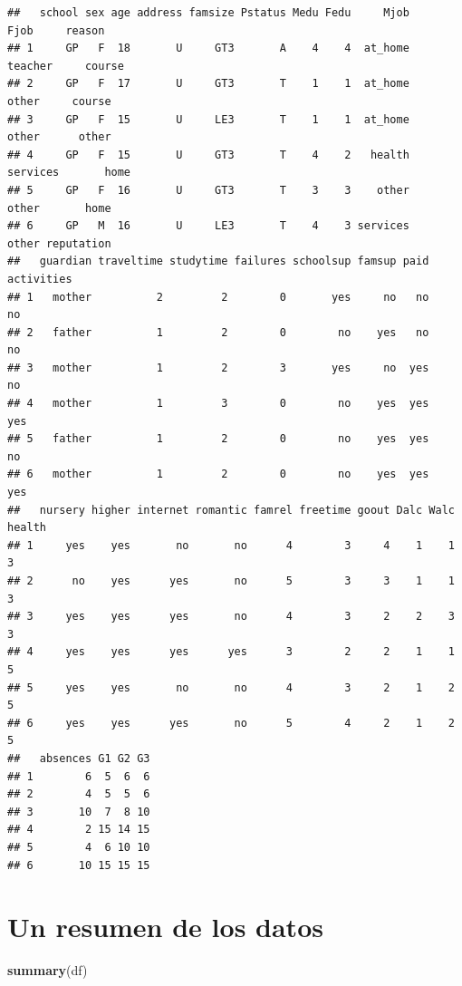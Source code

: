 \documentclass[
]{article}
\newenvironment{Shaded}{\begin{snugshade}}{\end{snugshade}}
\newcommand{\KeywordTok}[1]{\textcolor[rgb]{0.13,0.29,0.53}{\textbf{#1}}}
\newcommand{\NormalTok}[1]{#1}
\begin{document}
\begin{verbatim}
##   school sex age address famsize Pstatus Medu Fedu     Mjob     Fjob     reason
## 1     GP   F  18       U     GT3       A    4    4  at_home  teacher     course
## 2     GP   F  17       U     GT3       T    1    1  at_home    other     course
## 3     GP   F  15       U     LE3       T    1    1  at_home    other      other
## 4     GP   F  15       U     GT3       T    4    2   health services       home
## 5     GP   F  16       U     GT3       T    3    3    other    other       home
## 6     GP   M  16       U     LE3       T    4    3 services    other reputation
##   guardian traveltime studytime failures schoolsup famsup paid activities
## 1   mother          2         2        0       yes     no   no         no
## 2   father          1         2        0        no    yes   no         no
## 3   mother          1         2        3       yes     no  yes         no
## 4   mother          1         3        0        no    yes  yes        yes
## 5   father          1         2        0        no    yes  yes         no
## 6   mother          1         2        0        no    yes  yes        yes
##   nursery higher internet romantic famrel freetime goout Dalc Walc health
## 1     yes    yes       no       no      4        3     4    1    1      3
## 2      no    yes      yes       no      5        3     3    1    1      3
## 3     yes    yes      yes       no      4        3     2    2    3      3
## 4     yes    yes      yes      yes      3        2     2    1    1      5
## 5     yes    yes       no       no      4        3     2    1    2      5
## 6     yes    yes      yes       no      5        4     2    1    2      5
##   absences G1 G2 G3
## 1        6  5  6  6
## 2        4  5  5  6
## 3       10  7  8 10
## 4        2 15 14 15
## 5        4  6 10 10
## 6       10 15 15 15
\end{verbatim}

\hypertarget{un-resumen-de-los-datos}{%
\section{Un resumen de los datos}\label{un-resumen-de-los-datos}}

\begin{Shaded}
\begin{Highlighting}[]
\KeywordTok{summary}\NormalTok{(df)}
\end{Highlighting}
\end{Shaded}
\end{document}
